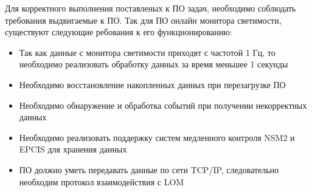   Для корректного выполнения поставленых к ПО задач, необходимо соблюдать требования выдвигаемые к ПО. Так для ПО онлайн монитора светимости, существуют следующие ребования к его функционированию:
\begin{itemize}
  \item Так как данные с монитора светимости приходят с частотой 1 Гц, то необходимо реализовать обработку данных за время меньшее 1 секунды
  \item Необходимо восстановление накопленных данных при перезагрузке ПО  
  \item Необходимо обнаружение и обработка событий при получении некорректных данных 
  \item Необходимо реализовать поддержку систем медленного контроля NSM2 и EPCIS для хранения данных
  \item ПО должно уметь передавать данные по сети TCP/IP, следовательно необходим протокол взаимодействия с LOM
\end{itemize}
